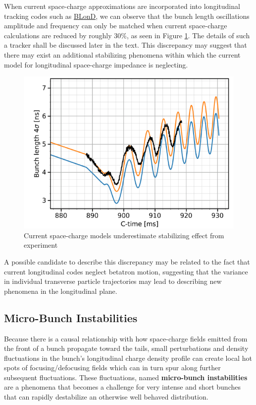 When current space-charge approximations are incorporated into longitudinal tracking codes such as \href{https://blond.web.cern.ch/}{BLonD}, we can observe that the bunch length oscillations amplitude and frequency can only be matched when current space-charge calculations are reduced by roughly 30\%, as seen in Figure \ref{fig:BlonD_v_experiment}. The details of such a tracker shall be discussed later in the text. This discrepancy may suggest that there may exist an additional stabilizing phenomena within which the current model for longitudinal space-charge impedance is neglecting.

\begin{figure}
    \centering
    \includegraphics{figs/simulation_v_experiment.png}
    \caption{Current space-charge models underestimate stabilizing effect from experiment}
    \label{fig:BlonD_v_experiment}
\end{figure}

A possible candidate to describe this discrepancy may be related to the fact that current longitudinal codes neglect betatron motion, suggesting that the variance in individual transverse particle trajectories may lead to describing new phenomena in the longitudinal plane.

\subsection{Micro-Bunch Instabilities}

Because there is a causal relationship with how space-charge fields emitted from the front of a bunch propagate toward the tails, small perturbations and density fluctuations in the bunch's longitudinal charge density profile can create local hot spots of focusing/defocusing fields which can in turn spur along further subsequent fluctuations. These fluctuations, named \textbf{micro-bunch instabilities} are a phenomena that becomes a challenge for very intense and short bunches that can rapidly destabilize an otherwise well behaved distribution.

